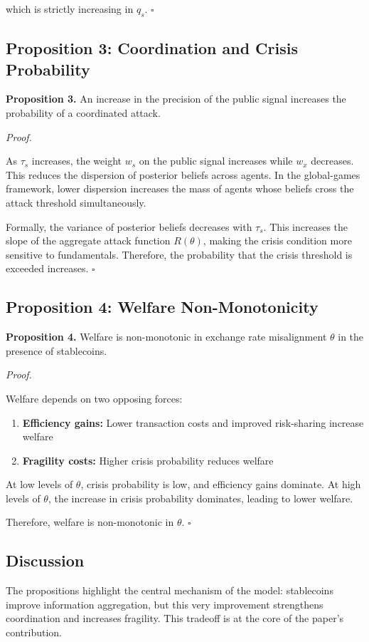 which is strictly increasing in $q_s$. \hfill $\square$

\subsection{Proposition 3: Coordination and Crisis Probability}

\textbf{Proposition 3.} An increase in the precision of the public signal increases the probability of a coordinated attack.

\textit{Proof.}

As $\tau_s$ increases, the weight $w_s$ on the public signal increases while $w_x$ decreases. This reduces the dispersion of posterior beliefs across agents. In the global-games framework, lower dispersion increases the mass of agents whose beliefs cross the attack threshold simultaneously.

Formally, the variance of posterior beliefs decreases with $\tau_s$. This increases the slope of the aggregate attack function $R(\theta)$, making the crisis condition more sensitive to fundamentals. Therefore, the probability that the crisis threshold is exceeded increases. \hfill $\square$

\subsection{Proposition 4: Welfare Non-Monotonicity}

\textbf{Proposition 4.} Welfare is non-monotonic in exchange rate misalignment $\theta$ in the presence of stablecoins.

\textit{Proof.}

Welfare depends on two opposing forces:

\begin{enumerate}
\item \textbf{Efficiency gains:} Lower transaction costs and improved risk-sharing increase welfare
\item \textbf{Fragility costs:} Higher crisis probability reduces welfare
\end{enumerate}

At low levels of $\theta$, crisis probability is low, and efficiency gains dominate. At high levels of $\theta$, the increase in crisis probability dominates, leading to lower welfare.

Therefore, welfare is non-monotonic in $\theta$. \hfill $\square$

\subsection{Discussion}

The propositions highlight the central mechanism of the model: stablecoins improve information aggregation, but this very improvement strengthens coordination and increases fragility. This tradeoff is at the core of the paper's contribution.
